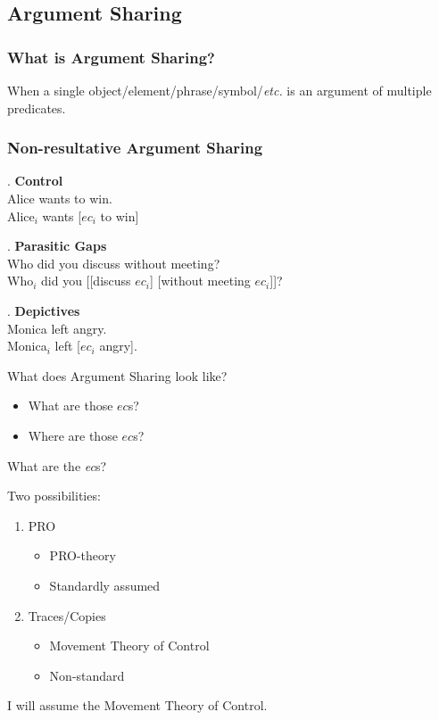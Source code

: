 \documentclass{beamer}
\begin{document}
\subsection{Argument Sharing}
\begin{frame}
  \frametitle{What is Argument Sharing?}
  When a single object/element/phrase/symbol/\textit{etc.} is an argument of multiple predicates.
\end{frame}
\begin{frame}
  \frametitle{Non-resultative Argument Sharing}
  \pause
  \ex. \textbf{Control}\\
    {\rm Alice wants to win.}\\
    Alice$_i$ wants [$ec_i$ to win]

  \pause
\ex. \textbf{Parasitic Gaps}\\
    {\rm Who did you discuss without meeting?}\\
    Who$_i$ did you [[discuss $ec_i$] [without meeting $ec_i$]]?
    
    \pause
    \ex. \textbf{Depictives}\\
    {\rm Monica left angry.}\\
    Monica$_i$ left [$ec_i$ angry].

\end{frame}
\begin{frame}
  {What does Argument Sharing look like?}
  \begin{itemize}
    \item What are those $ec$s?
    \item Where are those $ec$s?
  \end{itemize}
  
\end{frame}
\begin{frame}
  {What are the \textit{ec}s?}
  \begin{block}
    {Two possibilities:}
    \begin{enumerate}
      \item PRO
	\begin{itemize}
	  \item PRO-theory \parencite{chomsky1993lectures,culicover2001control,landau2003movement}
	  \item Standardly assumed
	\end{itemize}
      \item Traces/Copies
	\begin{itemize}
	  \item Movement Theory of Control \parencite{hornstein1999movement,boeckx2003reply,boeckx2006virtues}
	  \item Non-standard
	\end{itemize}
    \end{enumerate}
  \end{block}
\pause
I will assume the Movement Theory of Control.
\end{frame}
\end{document}

